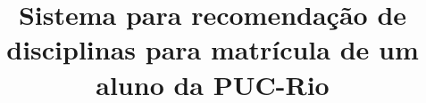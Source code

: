\documentclass[msc,brazilian]{thesispuc}%
\title{Sistema para recomendação de disciplinas para matrícula de um aluno da PUC-Rio}
\begin{document}
  
  
  
  
  
  
  
  
  
  
  
  
  
  
  \arial
   
\end{document}
